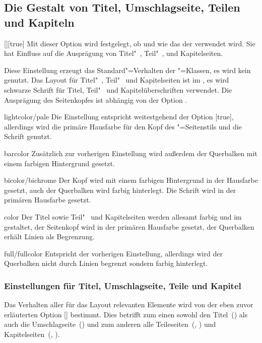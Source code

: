 \subsection{Die Gestalt von Titel, Umschlagseite, Teilen und Kapiteln}
\begin{Declaration}{[\PSet]}[true]
\printdeclarationlist%
%
%
Mit dieser Option wird festgelegt, ob und wie das \CD der \TnUD verwendet wird. 
Sie hat Einfluss auf die Ausprägung von Titel"~, Teil"~, und Kapitelseiten.
%
\begin{values}
\itemfalse
  Diese Einstellung erzeugt das Standard"=Verhalten der \KOMAScript"=Klassen, 
  es wird kein \CD genutzt.
  Das Layout für Titel"~, Teil"~ und Kapitelseiten ist im \CD, es wird 
  schwarze Schrift für Titel, Teil"~ und Kapitelüberschriften verwendet. Die 
  Ausprägung des Seitenkopfes ist abhängig von der Option .
\item[lightcolor/pale]
  Die Einstellung entspricht weitestgehend der Option [true], 
  allerdings wird die primäre Hausfarbe  für den Kopf des 
  "=Seitenstils und die Schrift genutzt.
\item[barcolor]
   Zusätzlich zur vorherigen Einstellung wird außerdem der 
  Querbalken mit einem farbigen Hintergrund gesetzt.
\item[bicolor/bichrome]
   Der Kopf wird mit einem farbigen Hintergrund in der 
  Hausfarbe gesetzt, auch der Querbalken wird farbig hinterlegt. Die Schrift 
  wird in der primären Hausfarbe gesetzt.
\item[color]
  Der Titel sowie Teil"~ und Kapitelseiten werden allesamt farbig und im \CD 
  gestaltet, der Seitenkopf wird in der primären Hausfarbe  
  gesetzt, der Querbalken erhält Linien als Begrenzung.
\item[full/fullcolor]
   Entspricht der vorherigen Einstellung, allerdings wird der 
  Querbalken nicht durch Linien begrenzt sondern farbig hinterlegt.
\end{values}
\end{Declaration}


\subsubsection{Einstellungen für Titel, Umschlagseite, Teile und Kapitel}
Das Verhalten aller für das Layout relevanten Elemente wird von der eben zuvor 
erläuterten Option [\PSet] bestimmt. Dies betrifft zum einen sowohl 
den Titel~() als auch die Umschlagseite~() 
und zum anderen alle Teileseiten~(, ) und 
Kapitelseiten~(, ).

